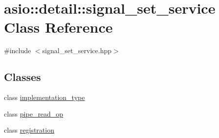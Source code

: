 \hypertarget{classasio_1_1detail_1_1signal__set__service}{}\section{asio\+:\+:detail\+:\+:signal\+\_\+set\+\_\+service Class Reference}
\label{classasio_1_1detail_1_1signal__set__service}


{\ttfamily \#include $<$signal\+\_\+set\+\_\+service.\+hpp$>$}

\subsection*{Classes}
\begin{DoxyCompactItemize}
\item 
class \hyperlink{classasio_1_1detail_1_1signal__set__service_1_1implementation__type}{implementation\+\_\+type}
\item 
class \hyperlink{classasio_1_1detail_1_1signal__set__service_1_1pipe__read__op}{pipe\+\_\+read\+\_\+op}
\item 
class \hyperlink{classasio_1_1detail_1_1signal__set__service_1_1registration}{registration}
\end{DoxyCompactItemize}
